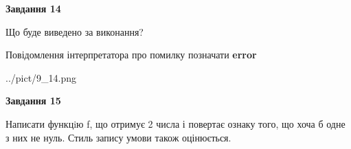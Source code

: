\documentclass[11pt, ukrainian]{article}
\begin{document}
{\begin {large}
{\begin {center}\textbf{Завдання 14}\end {center}}\par
Що буде виведено за виконання? \par
Повідомлення інтерпретатора про помилку позначати \textbf{error}

\begin{center}
	{../pict/9_14.png}
\end{center}
\newpage

{\begin {center}\textbf{Завдання 15}\end {center}}\par

Написати функцiю f, що отримує 2 числа і повертає ознаку того, що хоча б одне з них не нуль. Стиль запису умови також оцінюється.\par
\newpage

\end {large}}
\end{document}
